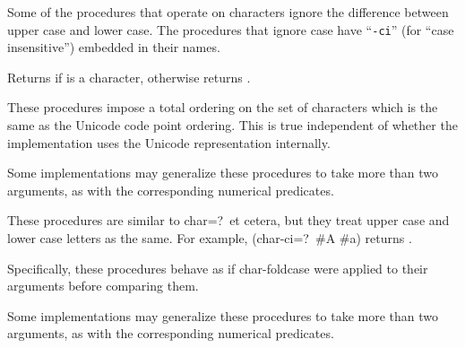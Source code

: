 \vest Some of the procedures that operate on characters ignore the
difference between upper case and lower case.  The procedures that
ignore case have \hbox{``{\tt -ci}''} (for ``case
insensitive'') embedded in their names.


\begin{entry}{%
}

Returns \schtrue{} if  is a character, otherwise returns \schfalse.

\end{entry}


\begin{entry}{%
}

\label{characterequality}
These procedures impose a total ordering on the set of characters which
is the same as the Unicode code point ordering.  This is true independent
of whether the implementation uses the Unicode representation internally.

Some implementations may generalize these procedures to take more than
two arguments, as with the corresponding numerical predicates.

\end{entry}


\begin{entry}{%
}

These procedures are similar to {\cf char=?}\ et cetera, but they treat
upper case and lower case letters as the same.  For example, {\cf
(char-ci=?\ \#\backwhack{}A \#\backwhack{}a)} returns \schtrue.

Specifically, these procedures behave as if {\cf char-foldcase} were
applied to their arguments before comparing them.

Some implementations may generalize these procedures to take more than
two arguments, as with the corresponding numerical predicates.

\end{entry}


